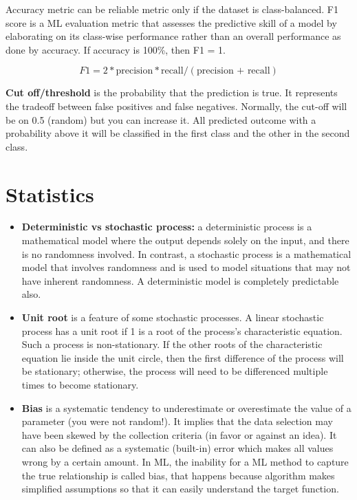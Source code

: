 \documentclass[
  letterpaper,
]{book}
\providecommand{\tightlist}{%
  \setlength{\itemsep}{0pt}\setlength{\parskip}{0pt}}\usepackage{longtable,booktabs,array}
\begin{document}
\begin{itemize}
  Accuracy metric can be reliable metric only if the dataset is
  class-balanced. F1 score is a ML evaluation metric that assesses the
  predictive skill of a model by elaborating on its class-wise
  performance rather than an overall performance as done by accuracy. If
  accuracy is 100\%, then F1 = 1.

  \[ F1 = 2 * \text{precision} * \text{recall} / (\text{precision + recall}) \]

  \textbf{Cut off/threshold} is the probability that the prediction is
  true. It represents the tradeoff between false positives and false
  negatives. Normally, the cut-off will be on 0.5 (random) but you can
  increase it. All predicted outcome with a probability above it will be
  classified in the first class and the other in the second class.
\end{itemize}

\hypertarget{statistics}{%
\section{Statistics}\label{statistics}}

\begin{itemize}
\tightlist
\item
  \textbf{Deterministic vs stochastic process:} a deterministic process
  is a mathematical model where the output depends solely on the input,
  and there is no randomness involved. In contrast, a stochastic process
  is a mathematical model that involves randomness and is used to model
  situations that may not have inherent randomness. A deterministic
  model is completely predictable also.
\item
  \textbf{Unit root} is a feature of some stochastic processes. A linear
  stochastic process has a unit root if 1 is a root of the process's
  characteristic equation. Such a process is non-stationary. If the
  other roots of the characteristic equation lie inside the unit circle,
  then the first difference of the process will be stationary;
  otherwise, the process will need to be differenced multiple times to
  become stationary.
\item
  \textbf{Bias} is a systematic tendency to underestimate or
  overestimate the value of a parameter (you were not random!). It
  implies that the data selection may have been skewed by the collection
  criteria (in favor or against an idea). It can also be defined as a
  systematic (built-in) error which makes all values wrong by a certain
  amount. In ML, the inability for a ML method to capture the true
  relationship is called bias, that happens because algorithm makes
  simplified assumptions so that it can easily understand the target
  function.
\end{itemize}
\end{document}

